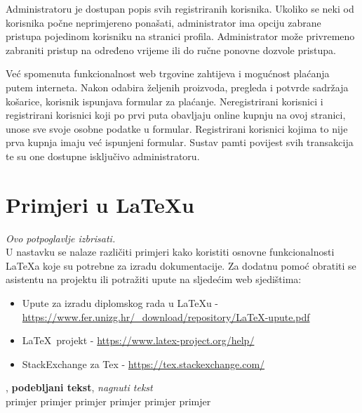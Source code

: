 		Administratoru je dostupan popis svih registriranih korisnika. Ukoliko se neki od korisnika počne neprimjereno ponašati, administrator ima opciju zabrane pristupa pojedinom korisniku na stranici profila. Administrator može privremeno zabraniti pristup na određeno vrijeme ili do ručne ponovne dozvole pristupa. 
		
		Već spomenuta funkcionalnost web trgovine zahtijeva i mogućnost plaćanja putem interneta. Nakon odabira željenih proizvoda, pregleda i potvrde sadržaja košarice, korisnik ispunjava formular za plaćanje. Neregistrirani korisnici i registrirani korisnici koji po prvi puta obavljaju online kupnju na ovoj stranici, unose sve svoje osobne podatke u formular. Registrirani korisnici kojima to nije prva kupnja imaju već ispunjeni formular. Sustav pamti povijest svih transakcija te su one dostupne isključivo administratoru.
		
		
		\section{Primjeri u \LaTeX u}
		
		\textit{Ovo potpoglavlje izbrisati.}\\

		U nastavku se nalaze različiti primjeri kako koristiti osnovne funkcionalnosti \LaTeX a koje su potrebne za izradu dokumentacije. Za dodatnu pomoć obratiti se asistentu na projektu ili potražiti upute na sljedećim web sjedištima:
		\begin{itemize}
			\item Upute za izradu diplomskog rada u \LaTeX u - \url{https://www.fer.unizg.hr/_download/repository/LaTeX-upute.pdf}
			\item \LaTeX\ projekt - \url{https://www.latex-project.org/help/}
			\item StackExchange za Tex - \url{https://tex.stackexchange.com/}\\
		
		\end{itemize} 	


		
		\noindent {}, \textbf{podebljani tekst}, 	\textit{nagnuti tekst}\\
		\noindent \normalsize primjer \large primjer \Large primjer \LARGE {primjer} \huge {primjer} \Huge primjer \normalsize
				
